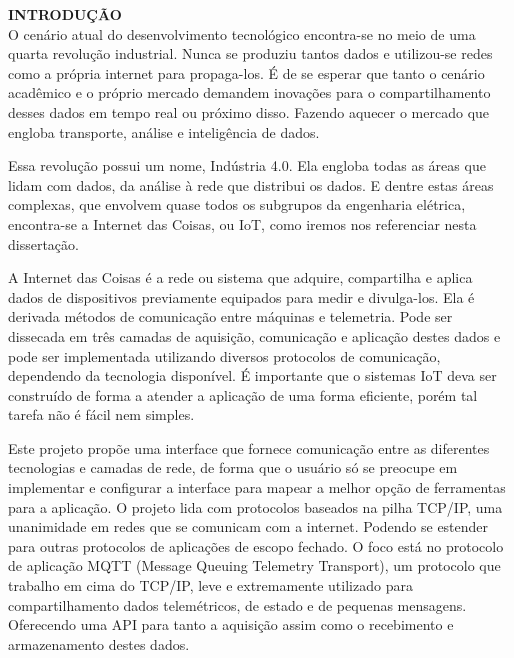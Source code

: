\noindent\textbf{INTRODUÇÃO}
$\!$\\

O cenário atual do desenvolvimento tecnológico encontra-se no meio de uma quarta revolução industrial. Nunca se produziu tantos dados e utilizou-se redes como a própria internet para propaga-los. É de se esperar que tanto o cenário acadêmico e o próprio mercado demandem inovações para o compartilhamento desses dados em tempo real ou próximo disso. Fazendo aquecer o mercado que engloba transporte, análise e inteligência de dados.

Essa revolução possui um nome, Indústria 4.0. Ela engloba todas as áreas que lidam com dados, da análise à rede que distribui os dados. E dentre estas áreas complexas, que envolvem quase todos os subgrupos da engenharia elétrica, encontra-se a Internet das Coisas, ou IoT, como iremos nos referenciar nesta dissertação.

A Internet das Coisas é a rede ou sistema que adquire, compartilha e aplica dados de dispositivos previamente equipados para medir e divulga-los. Ela é derivada métodos de comunicação entre máquinas e telemetria. Pode ser dissecada em três camadas de aquisição, comunicação e aplicação destes dados e pode ser implementada utilizando diversos protocolos de comunicação, dependendo da tecnologia disponível. É importante que o sistemas IoT deva ser construído de forma a atender a aplicação de uma forma eficiente, porém tal tarefa não é fácil nem simples.

Este projeto propõe uma interface que fornece comunicação entre as diferentes tecnologias e camadas de rede, de forma que o usuário só se preocupe em  implementar e configurar a interface para mapear a melhor opção de ferramentas para a aplicação. O projeto lida com protocolos baseados na pilha TCP/IP, uma unanimidade em redes que se comunicam com a internet. Podendo se estender para outras protocolos de aplicações de escopo fechado. O foco está no protocolo de aplicação MQTT (Message Queuing Telemetry Transport), um protocolo que trabalho em cima do TCP/IP, leve e extremamente utilizado para compartilhamento dados telemétricos, de estado e de pequenas mensagens. Oferecendo uma API para tanto a aquisição assim como o recebimento e armazenamento destes dados.

 
